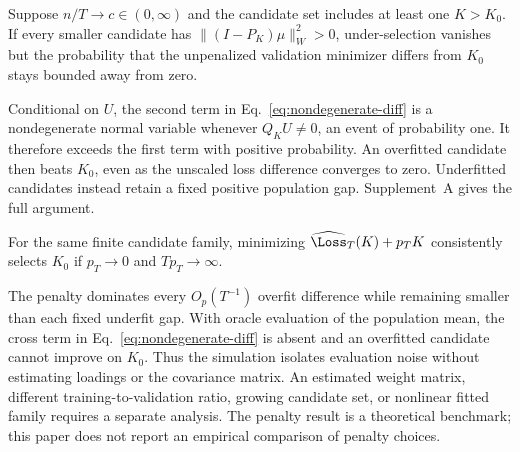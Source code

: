 \begin{proposition}
\label{prop:inconsistency}
Suppose $n/T\to c\in(0,\infty)$ and the candidate set includes at least one $K>K_0$. If every smaller candidate has $\|(I-P_K)\mu\|_W^2>0$, under-selection vanishes but the probability that the unpenalized validation minimizer differs from $K_0$ stays bounded away from zero.
\end{proposition}

Conditional on $U$, the second term in Eq.~\eqref{eq:nondegenerate-diff} is a nondegenerate normal variable whenever $Q_KU\ne0$, an event of probability one. It therefore exceeds the first term with positive probability. An overfitted candidate then beats $K_0$, even as the unscaled loss difference converges to zero. Underfitted candidates instead retain a fixed positive population gap. Supplement~A gives the full argument.

\begin{corollary}
\label{cor:penalty}
For the same finite candidate family, minimizing $\widehat\Loss_T(K)+p_TK$ consistently selects $K_0$ if $p_T\to0$ and $Tp_T\to\infty$.
\end{corollary}

The penalty dominates every $O_p(T^{-1})$ overfit difference while remaining smaller than each fixed underfit gap. With oracle evaluation of the population mean, the cross term in Eq.~\eqref{eq:nondegenerate-diff} is absent and an overfitted candidate cannot improve on $K_0$. Thus the simulation isolates evaluation noise without estimating loadings or the covariance matrix. An estimated weight matrix, different training-to-validation ratio, growing candidate set, or nonlinear fitted family requires a separate analysis. The penalty result is a theoretical benchmark; this paper does not report an empirical comparison of penalty choices.
